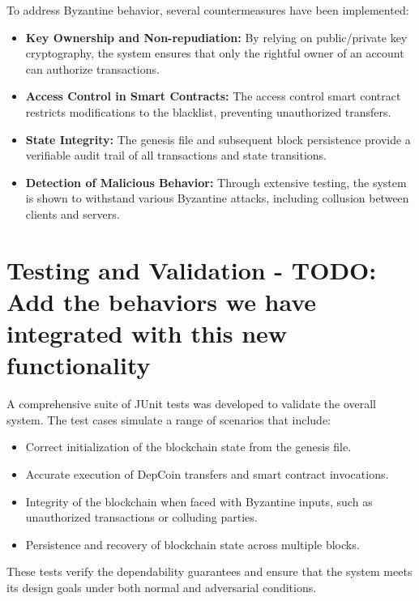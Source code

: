 \documentclass[runningheads]{llncs}
\begin{document}
To address Byzantine behavior, several countermeasures have been implemented:
\begin{itemize}
    \item \textbf{Key Ownership and Non-repudiation:} By relying on
    public/private key cryptography, the system ensures that only the rightful
    owner of an account can authorize transactions.
    \item \textbf{Access Control in Smart Contracts:} The access control smart
    contract restricts modifications to the blacklist, preventing unauthorized
    transfers.
    \item \textbf{State Integrity:} The genesis file and subsequent block
    persistence provide a verifiable audit trail of all transactions and state
    transitions.
    \item \textbf{Detection of Malicious Behavior:} Through extensive testing,
    the system is shown to withstand various Byzantine attacks, including
    collusion between clients and servers.
\end{itemize}

\section{Testing and Validation - TODO: Add the behaviors we have integrated with this new functionality}
A comprehensive suite of JUnit tests was developed to validate the overall
system. The test cases simulate a range of scenarios that include:
\begin{itemize}
    \item Correct initialization of the blockchain state from the genesis file.
    \item Accurate execution of DepCoin transfers and smart contract
    invocations.
    \item Integrity of the blockchain when faced with Byzantine inputs, such as
    unauthorized transactions or colluding parties.
    \item Persistence and recovery of blockchain state across multiple blocks.
\end{itemize}
These tests verify the dependability guarantees and ensure that the system meets
its design goals under both normal and adversarial conditions.
\end{document}
